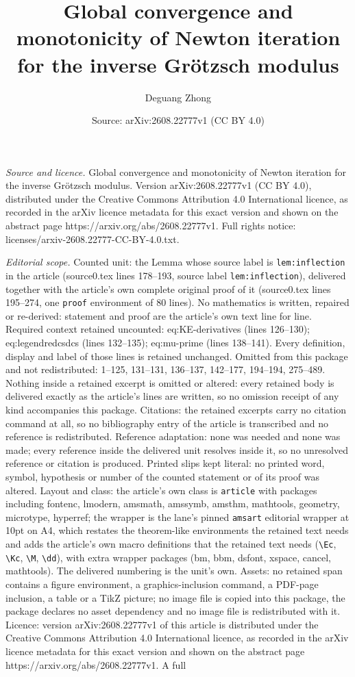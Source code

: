 \documentclass[10pt,a4paper]{amsart}
\title[Global convergence and monotonicity of Newton iteration for ]{Global convergence and monotonicity of Newton iteration for the inverse Gr\"otzsch modulus}
\author{Deguang Zhong}
\date{Source: arXiv:2608.22777v1 (CC BY 4.0)}
\begin{document}
\maketitle

\noindent\emph{Source and licence.} Global convergence and monotonicity of Newton iteration for the inverse Gr\"otzsch modulus. Version arXiv:2608.22777v1 (CC BY 4.0), distributed under the Creative Commons Attribution 4.0 International licence, as recorded in the arXiv licence metadata for this exact version and shown on the abstract page https://arxiv.org/abs/2608.22777v1. Full rights notice: licenses/arxiv-2608.22777-CC-BY-4.0.txt.\par\smallskip

\noindent\textit{Editorial scope.} Counted unit: the Lemma whose source label is \texttt{lem:inflection} in the article (source0.tex lines 178--193, source label \texttt{lem:inflection}), delivered together with the article's own complete original proof of it (source0.tex lines 195--274, one \texttt{proof} environment of 80 lines). No mathematics is written, repaired or re-derived: statement and proof are the article's own text line for line. Required context retained uncounted: eq:KE-derivatives (lines 126--130); eq:legendredcsdcs (lines 132--135); eq:mu-prime (lines 138--141). Every definition, display and label of those lines is retained unchanged. Omitted from this package and not redistributed: 1--125, 131--131, 136--137, 142--177, 194--194, 275--489. Nothing inside a retained excerpt is omitted or altered: every retained body is delivered exactly as the article's lines are written, so no omission receipt of any kind accompanies this package. Citations: the retained excerpts carry no citation command at all, so no bibliography entry of the article is transcribed and no reference is redistributed. Reference adaptation: none was needed and none was made; every reference inside the delivered unit resolves inside it, so no unresolved reference or citation is produced. Printed slips kept literal: no printed word, symbol, hypothesis or number of the counted statement or of its proof was altered. Layout and class: the article's own class is \texttt{article} with packages including fontenc, lmodern, amsmath, amssymb, amsthm, mathtools, geometry, microtype, hyperref; the wrapper is the lane's pinned \texttt{amsart} editorial wrapper at 10pt on A4, which restates the theorem-like environments the retained text needs and adds the article's own macro definitions that the retained text needs (\texttt{\textbackslash Ec}, \texttt{\textbackslash Kc}, \texttt{\textbackslash M}, \texttt{\textbackslash dd}), with extra wrapper packages (bm, bbm, dsfont, xspace, cancel, mathtools). The delivered numbering is the unit's own. Assets: no retained span contains a figure environment, a graphics-inclusion command, a PDF-page inclusion, a table or a TikZ picture; no image file is copied into this package, the package declares no asset dependency and no image file is redistributed with it. Licence: version arXiv:2608.22777v1 of this article is distributed under the Creative Commons Attribution 4.0 International licence, as recorded in the arXiv licence metadata for this exact version and shown on the abstract page https://arxiv.org/abs/2608.22777v1. A full 
\end{document}
